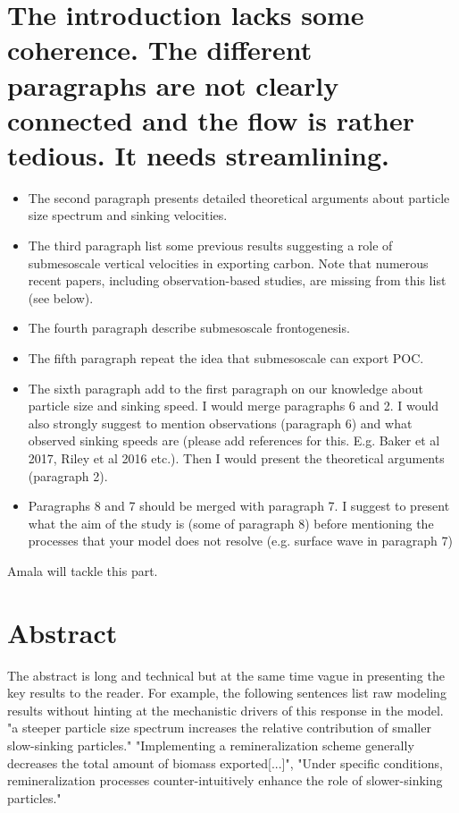 \documentclass[12pt,letter]{article}
\begin{document}
\section*{The introduction lacks some coherence. The different paragraphs are not clearly connected and the flow is rather tedious. It needs streamlining. }
\begin{itemize}
	\item	The second paragraph presents detailed theoretical arguments about particle size spectrum and sinking velocities. 
	\item	The third paragraph list some previous results suggesting a role of submesoscale vertical velocities in exporting carbon. Note that numerous recent papers, including observation-based studies, are missing from this list (see below).
	\item	The fourth paragraph describe submesoscale frontogenesis.
	\item	The fifth paragraph repeat the idea that submesoscale can export POC.
	\item	The sixth paragraph add to the first paragraph on our knowledge about particle size and sinking speed. I would merge paragraphs 6 and 2. I would also strongly suggest to mention observations (paragraph 6) and what observed sinking speeds are (please add references for this. E.g. Baker et al 2017, Riley et al 2016 etc.). Then I would present the theoretical arguments (paragraph 2). 
	\item	Paragraphs 8 and 7 should be merged with paragraph 7. I suggest to present what the aim of the study is (some of paragraph 8) before mentioning the processes that your model does not resolve (e.g. surface wave in paragraph 7)
\end{itemize}

{\color{red} Amala will tackle this part.}

\section*{Abstract}
The abstract is long and technical but at the same time vague in presenting the key results to the reader. For example, the following sentences list raw modeling results without hinting at the mechanistic drivers of this response in the model. 
"a steeper particle size spectrum increases the relative contribution of smaller slow-sinking particles." "Implementing a remineralization scheme generally decreases the total amount of biomass exported[...]", "Under specific conditions, remineralization processes counter-intuitively enhance the role of slower-sinking particles."
\end{document}
